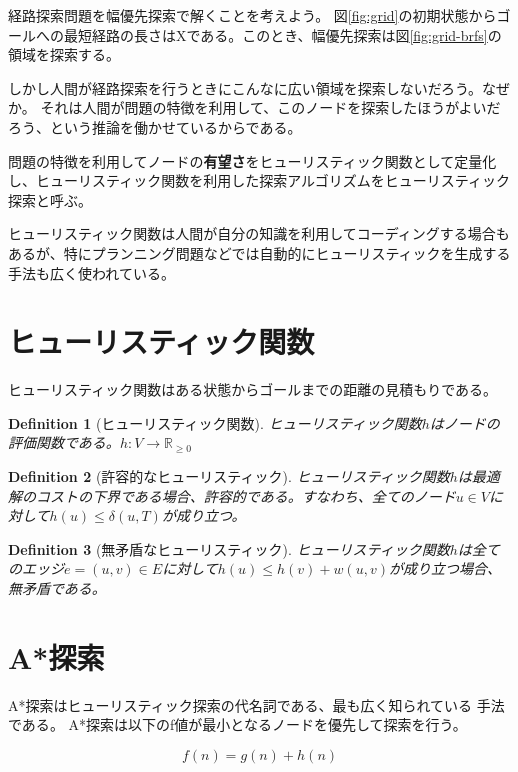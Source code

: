 \documentclass{report}
\newtheorem{definition}{Definition}
\begin{document}
経路探索問題を幅優先探索で解くことを考えよう。
図\ref{fig:grid}の初期状態からゴールへの最短経路の長さはXである。このとき、幅優先探索は図\ref{fig:grid-brfs}の領域を探索する。

しかし人間が経路探索を行うときにこんなに広い領域を探索しないだろう。なぜか。
それは人間が問題の特徴を利用して、このノードを探索したほうがよいだろう、という推論を働かせているからである。

問題の特徴を利用してノードの{\bf 有望さ}をヒューリスティック関数として定量化し、ヒューリスティック関数を利用した探索アルゴリズムをヒューリスティック探索と呼ぶ。

ヒューリスティック関数は人間が自分の知識を利用してコーディングする場合もあるが、特にプランニング問題などでは自動的にヒューリスティックを生成する手法も広く使われている。


\section{ヒューリスティック関数}
\label{sec:heuristic-function}

ヒューリスティック関数はある状態からゴールまでの距離の見積もりである。

\begin{definition}[ヒューリスティック関数]
ヒューリスティック関数$h$はノードの評価関数である。$h: V \rightarrow \mathbb{R}_{\geq 0}$
\end{definition}

\begin{definition}[許容的なヒューリスティック]
ヒューリスティック関数$h$は最適解のコストの下界である場合、許容的である。すなわち、全てのノード$u \in V$に対して$h(u) \leq \delta(u, T)$が成り立つ。
\end{definition}

\begin{definition}[無矛盾なヒューリスティック]
ヒューリスティック関数$h$は全てのエッジ$e = (u, v) \in E$に対して$h(u) \leq h(v) + w(u,v)$が成り立つ場合、無矛盾である。
\end{definition}


\section{A*探索}
\label{sec:astar-search}

A*探索はヒューリスティック探索の代名詞である、最も広く知られている
手法である\cite{astar}。
A*探索は以下のf値が最小となるノードを優先して探索を行う。

\begin{equation}
	f(n) = g(n) + h(n)
\end{equation}
\end{document}
